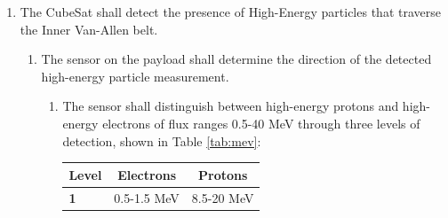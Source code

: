\begin{enumerate}
        \begin{enumerate}
            \item The components of the CubeSat shall be tested to ensure they are functioning initially, functioning throughout a normal cycle, and functioning before launch. 
                \begin{enumerate}
                    \item The CubeSat shall rectify electronic problems caused by radiation or alert the team of known errors. 
                        \begin{itemize}
                            \item Motivation: In the case of a SEE, the CubeSat must either fix itself by resetting hardware or signal the error so it can be accounted for in data processing.
                            \item Verification: If proton beam testing is available, then the system can be tested to show that solutions exist. If not, then systems for repair must be put in place and tested synthetically. 
                        \end{itemize}
                \end{enumerate}
        \end{enumerate} %
        \item The CubeSat shall detect the presence of High-Energy particles that traverse the Inner Van-Allen belt.
            \begin{enumerate}
                \item The sensor on the payload shall determine the direction of the detected high-energy particle measurement.
                    \begin{enumerate}
                        \item The sensor shall distinguish between high-energy protons and high-energy electrons of flux ranges 0.5-40 MeV through three levels of detection, shown in Table \ref{tab:mev}:
                        \begin{table}[H]
                        \centering
                        \begin{tabular}{|l|c|c|} 
                        \hline
                        \textbf{Level} & \textbf{Electrons} & \textbf{Protons}
                        \\
                        \hline
                        \textbf{1} & 0.5-1.5 MeV & 8.5-20 MeV
                        \\
                        \hline

\end{tabular}
\end{table}
\end{enumerate}
\end{enumerate}
\end{enumerate}
